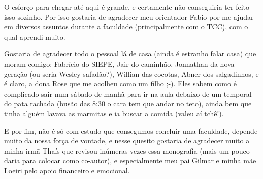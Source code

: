 \begin{agradecimentos}

O esforço para chegar até aqui é grande, e certamente não conseguiria ter feito isso sozinho. Por isso gostaria de agradecer meu orientador Fabio por me ajudar em diversos assuntos durante a faculdade (principalmente com o TCC), com o qual aprendi muito. 

Gostaria de agradecer todo o pessoal lá de casa (ainda é estranho falar casa) que moram comigo: Fabrício do SIEPE, Jair do caminhão, Jonnathan da nova geração (ou seria Wesley safadão?), Willian das cocotas, Abner dos salgadinhos, e é claro, a dona Rose que me acolheu como um filho ;-). Eles sabem como é complicado sair num sábado de manhã para ir na aula debaixo de um temporal do pata rachada (busão das 8:30 o cara tem que andar no teto), ainda bem que tinha alguém lavava as marmitas e ia buscar a comida (valeu aí tchê!). 

E por fim, não é só com estudo que consegumos concluir uma faculdade, depende muito da nossa força de vontade, e nesse quesito gostaria de agradecer muito a minha irmã Thaís que revisou inúmeras vezes essa monografia (mais um pouco daria para colocar como co-autor), e especialmente meu pai Gilmar e minha mãe Loeiri pelo apoio financeiro e emocional.  


\end{agradecimentos}